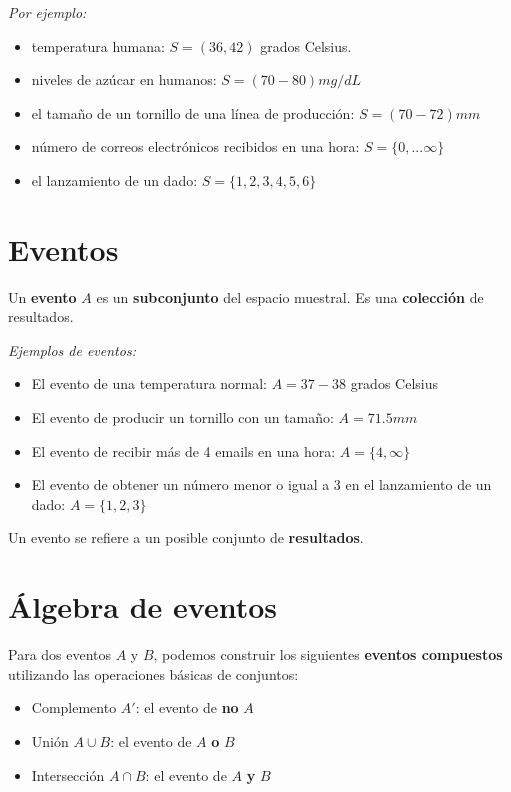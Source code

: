 \documentclass[
]{book}
\providecommand{\tightlist}{%
  \setlength{\itemsep}{0pt}\setlength{\parskip}{0pt}}
\begin{document}
\emph{Por ejemplo:}

\begin{itemize}
\tightlist
\item
  temperatura humana: \(S = (36, 42)\) grados Celsius.
\item
  niveles de azúcar en humanos: \(S=(70-80) mg/dL\)
\item
  el tamaño de un tornillo de una línea de producción: \(S=(70-72) mm\)
\item
  número de correos electrónicos recibidos en una hora: \(S =\{0, ...\infty \}\)
\item
  el lanzamiento de un dado: \(S=\{1, 2, 3, 4, 5, 6\}\)
\end{itemize}

\hypertarget{eventos}{%
\section{Eventos}\label{eventos}}

Un \textbf{evento} \(A\) es un \textbf{subconjunto} del espacio muestral. Es una \textbf{colección} de resultados.

\emph{Ejemplos de eventos:}

\begin{itemize}
\tightlist
\item
  El evento de una temperatura normal: \(A=37-38\) grados Celsius
\item
  El evento de producir un tornillo con un tamaño: \(A=71.5mm\)
\item
  El evento de recibir más de 4 emails en una hora: \(A=\{4, \infty \}\)
\item
  El evento de obtener un número menor o igual a 3 en el lanzamiento de un dado: \(A=\{1,2,3\}\)
\end{itemize}

Un evento se refiere a un posible conjunto de \textbf{resultados}.

\hypertarget{uxe1lgebra-de-eventos}{%
\section{Álgebra de eventos}\label{uxe1lgebra-de-eventos}}

Para dos eventos \(A\) y \(B\), podemos construir los siguientes \textbf{eventos compuestos} utilizando las operaciones básicas de conjuntos:

\begin{itemize}
\tightlist
\item
  Complemento \(A'\): el evento de \textbf{no} \(A\)
\item
  Unión \(A \cup B\): el evento de \(A\) \textbf{o} \(B\)
\item
  Intersección \(A \cap B\): el evento de \(A\) \textbf{y} \(B\)
\end{itemize}
\end{document}
